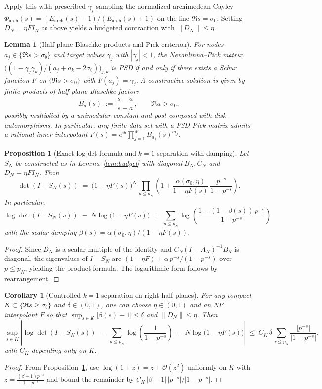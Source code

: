 \documentclass[11pt]{article}
\newtheorem{proposition}[theorem]{Proposition}
\newtheorem{lemma}[theorem]{Lemma}
\newtheorem{corollary}[theorem]{Corollary}
\theoremstyle{definition}
\theoremstyle{remark}
\begin{document}
Apply this with prescribed $\gamma_j$ sampling the normalized archimedean Cayley $\Phi_{\mathrm{arch}}(s)=(E_{\mathrm{arch}}(s)-1)/(E_{\mathrm{arch}}(s)+1)$ on the line $\Re s=\sigma_0$. Setting $D_N=\eta F I_N$ as above yields a budgeted contraction with $\|D_N\|\le \eta$.

\begin{lemma}[Half-plane Blaschke products and Pick criterion]\label{lem:halfplane-blaschke}
For nodes $a_j\in\{\Re s>\sigma_0\}$ and target values $\gamma_j$ with $|\gamma_j|<1$, the Nevanlinna--Pick matrix $\big((1-\gamma_j\overline{\gamma_k})/(a_j+\overline{a_k}-2\sigma_0)\big)_{j,k}$ is PSD if and only if there exists a Schur function $F$ on $\{\Re s>\sigma_0\}$ with $F(a_j)=\gamma_j$. A constructive solution is given by finite products of half-plane Blaschke factors
\[
 B_{a}(s)\;:=\;\frac{s-\overline a}{s-a}\,,\qquad \Re a>\sigma_0,
\]
possibly multiplied by a unimodular constant and post-composed with disk automorphisms. In particular, any finite data set with a PSD Pick matrix admits a rational inner interpolant $F(s)=e^{i\theta}\prod_{j=1}^{M} B_{a_j}(s)^{m_j}$.
\end{lemma}


\begin{proposition}[Exact log-det formula and $k=1$ separation with damping]\label{prop:logdet-S}
Let $S_N$ be constructed as in Lemma~\ref{lem:budget} with diagonal $B_N,C_N$ and $D_N=\eta F I_N$. Then
\[
 \det(I-S_N(s))\;=\;\big(1-\eta F(s)\big)^{N}\,\prod_{p\le p_N}\left(1+\frac{\alpha(\sigma_0,\eta)}{1-\eta F(s)}\,\frac{p^{-s}}{1-p^{-s}}\right).
\]
In particular,
\[
 \log\det(I-S_N(s))\;=\;N\log\big(1-\eta F(s)\big)\; +\; \sum_{p\le p_N}\log\left(\frac{1-(1-\beta(s))\,p^{-s}}{1-p^{-s}}\right)
\]
with the scalar damping $\beta(s)=\alpha(\sigma_0,\eta)/(1-\eta F(s))$.
\end{proposition}
\begin{proof}
Since $D_N$ is a scalar multiple of the identity and $C_N(I-A_N)^{-1}B_N$ is diagonal, the eigenvalues of $I-S_N$ are $(1-\eta F)+\alpha\, p^{-s}/(1-p^{-s})$ over $p\le p_N$, yielding the product formula. The logarithmic form follows by rearrangement.
\end{proof}

\begin{corollary}[Controlled $k=1$ separation on right half-planes]
For any compact $K\subset\{\Re s\ge \sigma_0\}$ and $\delta\in(0,1)$, one can choose $\eta\in(0,1)$ and an NP interpolant $F$ so that $\sup_{s\in K}|\beta(s)-1|\le \delta$ and $\|D_N\|\le \eta$. Then
\[
 \sup_{s\in K}\left|\log\det(I-S_N(s))\; -\; \sum_{p\le p_N}\log\!\left(\frac{1}{1-p^{-s}}\right)\; -\;N\log\big(1-\eta F(s)\big)\right|\ \le\ C_K\,\delta\,\sum_{p\le p_N}\frac{|p^{-s}|}{|1-p^{-s}|},
\]
with $C_K$ depending only on $K$.
\end{corollary}
\begin{proof}
From Proposition~\ref{prop:logdet-S}, use $\log(1+z)=z+\mathcal O(z^2)$ uniformly on $K$ with $z=\tfrac{(\beta-1)p^{-s}}{1-p^{-s}}$ and bound the remainder by $C_K\,|\beta-1|\,|p^{-s}|/|1-p^{-s}|$.
\end{proof}
\end{document}
